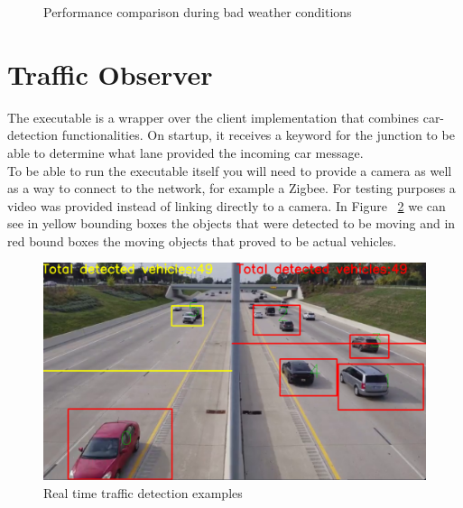 \documentclass[17pt]{report}
\begin{document}
\begin{figure}[h!]
    \centering
    \label{fig:Optimizer vs no optimizers in rain}
    \caption{Performance comparison during bad weather conditions}
\end{figure}


\pagebreak
\section{Traffic Observer}
\indent \indent
The executable is a wrapper over the client implementation that combines
car-detection functionalities. On startup, it receives a keyword for the junction to be able
to determine what lane provided the incoming car message. \\
\indent
To be able to run the executable itself you will need to provide a camera as well as a way to 
connect to the network, for example a Zigbee. For testing purposes a
video was provided instead of linking directly to a camera. In Figure 
~\ref{fig:Running client samples} we can see in yellow bounding boxes 
the objects that were detected to be moving and in red bound boxes 
the moving objects that proved to be actual vehicles.

\begin{figure}[h!]
    \includegraphics[width=\textwidth]{TrafficDetectionRunningExample2.png}
    \caption{Real time traffic detection examples}
    \label{fig:Running client samples}
\end{figure}
\end{document}
